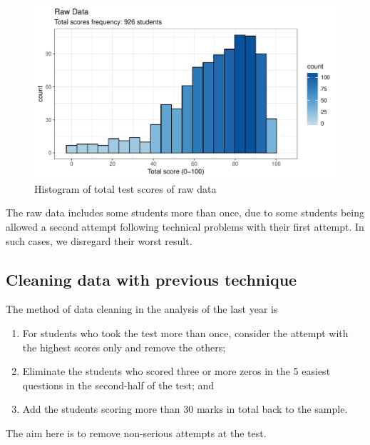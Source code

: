\documentclass[a4paper]{report}
\begin{document}
\begin{figure}[H]
  \centering
  \includegraphics[width=\linewidth]{fig/EDA_hist_17.pdf}
  \caption{\label{fig:EDA_hist_17}Histogram of total test scores of raw data}
\end{figure}

The raw data includes some students more than once, due to some students being allowed a second attempt following technical problems with their first attempt. In such cases, we disregard their worst result. 


\subsection{Cleaning data with previous technique}

The method of data cleaning in the analysis of the last year \cite{lastyear} is 

\begin{enumerate}
\item For students who took the test more than once, consider the attempt with the highest scores only and remove the others; 
\item Eliminate the students who scored three or more zeros in the 5 easiest questions in the second-half of the test; and
\item Add the students scoring more than 30 marks in total back to the sample. 
\end{enumerate}

The aim here is to remove non-serious attempts at the test. 
\end{document}
